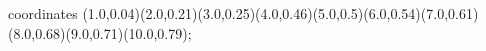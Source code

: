 					coordinates { (1.0,0.04)(2.0,0.21)(3.0,0.25)(4.0,0.46)(5.0,0.5)(6.0,0.54)(7.0,0.61)(8.0,0.68)(9.0,0.71)(10.0,0.79)};